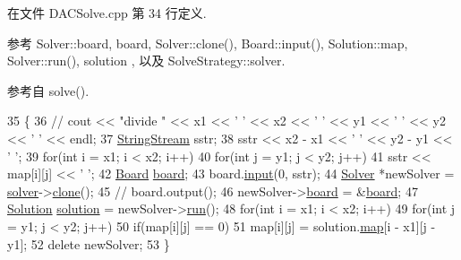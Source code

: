 在文件 D\+A\+C\+Solve.\+cpp 第 34 行定义.



参考 Solver\+::board, board, Solver\+::clone(), Board\+::input(), Solution\+::map, Solver\+::run(), solution , 以及 Solve\+Strategy\+::solver.



参考自 solve().


\begin{DoxyCode}
35 \{
36     \textcolor{comment}{// cout << "divide " << x1 << ' ' << x2 << ' ' << y1 << ' ' << y2 << ' ' << endl;}
37     \hyperlink{global_8h_a3b00b4d9ec9db1584a445acde990ced6}{StringStream} sstr;
38     sstr << x2 - x1 << \textcolor{charliteral}{' '} << y2 - y1 << \textcolor{charliteral}{' '};
39     \textcolor{keywordflow}{for}(\textcolor{keywordtype}{int} i = x1; i < x2; i++)
40         \textcolor{keywordflow}{for}(\textcolor{keywordtype}{int} j = y1; j < y2; j++)
41             sstr << map[i][j] << \textcolor{charliteral}{' '};
42     \hyperlink{classBoard}{Board} \hyperlink{classes_8txt_ab2104b75e0965a7c5fc13208045d9b59}{board};
43     board.\hyperlink{classBoard_ace215dfac6b741c9fb51cc40a6fe6ab1}{input}(0, sstr);
44     \hyperlink{classSolver}{Solver} *newSolver = \hyperlink{classSolveStrategy_a94d43c47305176d0d3858697d3410443}{solver}->\hyperlink{classSolver_a1a6f0075358685b01c83188d206e41a5}{clone}();
45     \textcolor{comment}{// board.output();}
46     newSolver->\hyperlink{classSolver_a8966a22c2f247addc8ce453d119bc54e}{board} = &\hyperlink{classes_8txt_ab2104b75e0965a7c5fc13208045d9b59}{board};
47     \hyperlink{classSolution}{Solution} \hyperlink{classes_8txt_aa43d5190bbc491d9c9134146e01a248e}{solution} = newSolver->\hyperlink{classSolver_ac0b51cb3578988fe9c461ea3fc424bef}{run}();
48     \textcolor{keywordflow}{for}(\textcolor{keywordtype}{int} i = x1; i < x2; i++)
49         \textcolor{keywordflow}{for}(\textcolor{keywordtype}{int} j = y1; j < y2; j++)
50             \textcolor{keywordflow}{if}(map[i][j] == 0)
51                 map[i][j] = solution.\hyperlink{classSolution_ae89ccd74484f2c87afa05b16f8ee5bf6}{map}[i - x1][j - y1];
52     \textcolor{keyword}{delete} newSolver;
53 \}
\end{DoxyCode}


